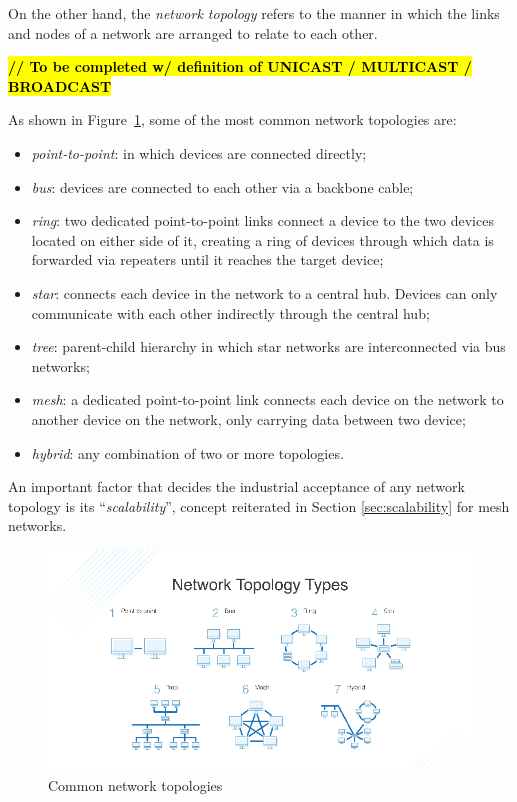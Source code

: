 		On the other hand, the \textit{network topology} refers to the manner in which the links and nodes of a network are arranged to relate to each other.
	
		\textbf{\textcolor{red}{\hl{// To be completed w/ definition of UNICAST / MULTICAST / BROADCAST}}}
		
		As shown in Figure~\ref{img:network_topologies}, some of the most common network topologies are:
		\begin{itemize}
			\item \textit{point-to-point}: in which devices are connected directly;
			\item \textit{bus}: devices are connected to each other via a backbone cable;
			\item \textit{ring}: two dedicated point-to-point links connect a device to the two devices located on either side of it, creating a ring of devices through which data is forwarded via repeaters until it reaches the target device;
			\item \textit{star}: connects each device in the network to a central hub. Devices can only communicate with each other indirectly through the central hub;
			\item \textit{tree}: parent-child hierarchy in which star networks are interconnected via bus networks;
			\item \textit{mesh}: a dedicated point-to-point link connects each device on the network to another device on the network, only carrying data between two device;
			\item \textit{hybrid}: any combination of two or more topologies.
		\end{itemize}
	
		An important factor that decides the industrial acceptance of any network topology is its ``\textit{scalability}'', concept reiterated in Section \ref{sec:scalability} for mesh networks.
	
		\begin{figure}[h]
			\centering
			\includegraphics[width=\textwidth]{resources/img/chap3/network_topologies}
			\caption{Common network topologies}
			\label{img:network_topologies}
		\end{figure}
	
